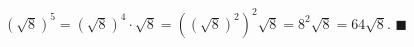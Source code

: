 $\left(\sqrt8\right)^5=\left(\sqrt8\right)^4\cdot\sqrt8=\left(\left(\sqrt8\right)^2\right)^2\sqrt8=8^2\sqrt8=64\sqrt8$. $\blacksquare$
